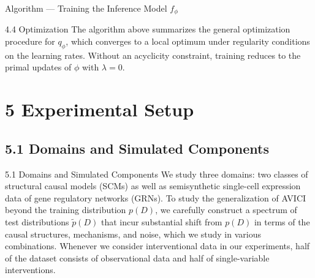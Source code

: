 \documentclass[aspectratio=169,10pt]{beamer}
\newcommand{\ours}{AVICI\xspace}
\begin{document}
\begin{frame}{Algorithm --- Training the Inference Model $f_\phi$}
\begin{algorithm}[H]
\begin{algorithmic}
        \STATE{$\Delta \phi \propto \nabla_\phi \big (
             \Lcal(\phi) - \lambda \Fcal(\phi)
        \big ) $}
    \ENDFOR
    \STATE{$\lambda \gets \lambda + \eta \Fcal(\phi)$}
\ENDWHILE
\end{algorithmic}
\end{algorithm}
\end{frame}

\begin{frame}{4.4 Optimization}
The algorithm above summarizes the general optimization procedure for $q_\phi$, which converges to a local optimum under regularity conditions on the learning rates. Without an acyclicity constraint, training reduces to the primal updates of $\phi$ with $\lambda = 0$.
\end{frame}

\section{5 Experimental Setup}
\subsection{5.1 Domains and Simulated Components}

\begin{frame}{5.1 Domains and Simulated Components}
We study three domains: two classes of structural causal models (SCMs) as well as semisynthetic single-cell expression data of gene regulatory networks (GRNs). To study the generalization of \ours beyond the training distribution $p(D)$, we carefully construct a spectrum of test distributions $\tilde{p}(D)$ that incur substantial shift from $p(D)$ in terms of the causal structures, mechanisms, and noise, which we study in various combinations. Whenever we consider interventional data in our experiments, half of the dataset consists of observational data and half of single-variable interventions.
\end{frame}
\end{document}
